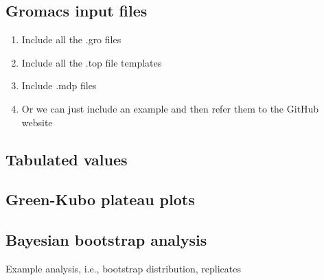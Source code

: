 \documentclass[11pt,a4paper]{article}
\begin{document}
\subsection{Gromacs input files}

\begin{enumerate}
	\item Include all the .gro files
	\item Include all the .top file templates
	\item Include .mdp files
	\item Or we can just include an example and then refer them to the GitHub website
\end{enumerate}

\subsection{Tabulated values}

\subsection{Green-Kubo plateau plots}

\subsection{Bayesian bootstrap analysis}

Example analysis, i.e., bootstrap distribution, replicates
\end{document}
